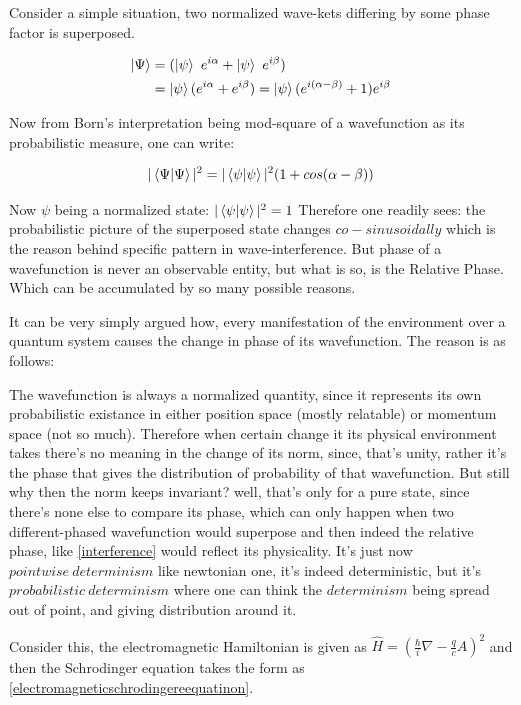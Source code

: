 \documentclass[8pt, twocoloumn]{article}
\begin{document}
Consider a simple situation, two normalized wave-kets differing by some phase factor is superposed. 

\begin{align}
    \ket{\Psi} &= (\ket{\psi} \ e^{i \alpha} + \ket{\psi} \ e^{i \beta})  \\
    &= \ket{\psi}(e^{i \alpha} + e^{i \beta}) = \ket{\psi}(e^{i (\alpha - \beta)} + 1) e^{i\beta} 
\end{align}

Now from Born's interpretation being mod-square of a wavefunction as its probabilistic measure, one can write:

\begin{align}{\label{interference}}
    |\braket{\Psi|\Psi}|^{2} = |\braket{\psi|\psi}|^{2}(1+cos(\alpha - \beta)) 
\end{align}

Now $\psi$ being a normalized state: $|\braket{\psi|\psi}|^{2} = 1$ Therefore one readily sees: the probabilistic picture of the superposed state changes $co-sinusoidally$ which is the reason behind specific pattern in wave-interference.  But phase of a wavefunction is never an observable entity, but what is so, is the Relative Phase. Which can be accumulated by so many possible reasons. 

It can be very simply argued how, every manifestation of the environment over a quantum system causes the change in phase of its wavefunction. The reason is as follows:

The wavefunction is always a normalized quantity, since it represents its own probabilistic existance in either position space (mostly relatable) or momentum space (not so much). Therefore when certain change it its physical environment takes there's no meaning in the change of its norm, since, that's unity, rather it's the phase that gives the distribution of probability of that wavefunction. But still why then the norm keeps invariant? well, that's only for a pure state, since there's none else to compare its phase, which can only happen when two different-phased wavefunction would superpose and then indeed the relative phase, like \ref{interference} would reflect its physicality. It's just now $pointwise \ determinism$ like newtonian one, it's indeed deterministic, but it's $probabilistic \ determinism$ where one can think the $determinism$ being spread out of point, and giving distribution around it. 

Consider this, the electromagnetic Hamiltonian is given as $\hat{H} = {(\frac{\hbar}{i}\nabla - \frac{q}{c}A)}^{2}$ and then the Schrodinger equation takes the form as \ref{electromagneticschrodingereequatinon}. 
\end{document}
